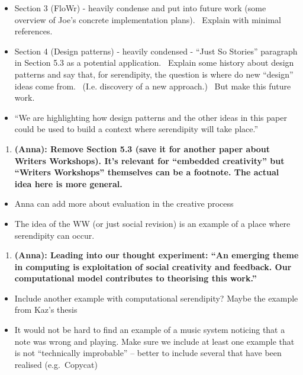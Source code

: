 \begin{itemize}
\itemsep1pt\parskip0pt
\item
  Section 3 (FloWr) - heavily condense and put into future work (some
  overview of Joe's concrete implementation plans). ~Explain with
  minimal references.
\item
  Section 4 (Design patterns) - heavily condensed - ``Just So Stories''
  paragraph in Section 5.3 as a potential application. ~Explain some
  history about design patterns and say that, for serendipity, the
  question is where do new ``design'' ideas come from. ~(I.e. discovery
  of a new approach.) ~But make this future work.
\item
  ``We are highlighting how design patterns and the other ideas in this
  paper could be used to build a context where serendipity will take
  place.''
\end{itemize}

\begin{enumerate}
\def\labelenumi{\arabic{enumi}.}
\setcounter{enumi}{3}
\itemsep1pt\parskip0pt
\item
  \textbf{(Anna): Remove Section 5.3 (save it for another paper about
  Writers Workshops). It's relevant for ``embedded creativity'' but
  ``Writers Workshops'' themselves can be a footnote. The actual idea
  here is more general.}
\end{enumerate}

\begin{itemize}
\itemsep1pt\parskip0pt
\item
  Anna can add more about evaluation in the creative process
\item
  The idea of the WW (or just social revision) is an example of a place
  where serendipity can occur.
\end{itemize}

\begin{enumerate}
\def\labelenumi{\arabic{enumi}.}
\setcounter{enumi}{4}
\itemsep1pt\parskip0pt
\item
  \textbf{(Anna): Leading into our thought experiment: ``An emerging
  theme in computing is exploitation of social creativity and feedback.
  Our computational model contributes to theorising this work.''}
\end{enumerate}

\begin{itemize}
\itemsep1pt\parskip0pt
\item
  Include another example with computational serendipity? Maybe the
  example from Kaz's thesis
\item
  It would not be hard to find an example of a music system noticing
  that a note was wrong and playing. Make sure we include at least one
  example that is not ``technically improbable'' -- better to include
  several that have been realised (e.g.~Copycat)
\end{itemize}

